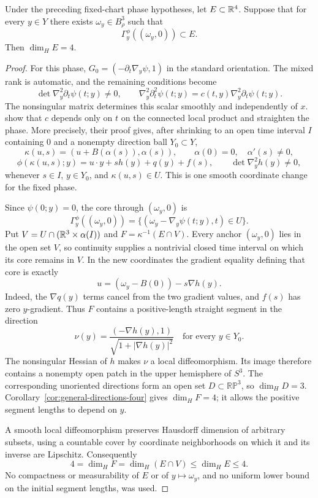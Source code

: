 \begin{corollary}
\label{cor:curved-kakeya-four}
Under the preceding fixed-chart phase hypotheses, let
\(E\subset\mathbb R^4\). Suppose that for every \(y\in Y\) there exists
\(\omega_y\in B_\rho^3\) such that
\[
 \Gamma_y^\phi((\omega_y,0))\subset E.
\]
Then \(\dim_H E=4\).
\end{corollary}
\begin{proof}
For this phase, \(G_0=(-\partial_t\nabla_y\psi,1)\) in the standard
orientation. The mixed rank is automatic, and the remaining
conditions become
\[
 \det\nabla_y^2\partial_t\psi(t;y)\ne0,\qquad
 \nabla_y^2\partial_t^2\psi(t;y)
   =c(t,y)\nabla_y^2\partial_t\psi(t;y).
\]
The nonsingular matrix determines this scalar smoothly and
independently of \(x\).
\citet[Corollary~4.2 and Theorem~1.12]{GaoLiuXi2025} show that \(c\)
depends only on \(t\) on the connected local product and straighten
the phase. More precisely, their proof gives, after shrinking to an
open time interval \(I\) containing \(0\) and a nonempty direction
ball \(Y_0\subset Y\),
\[
 \kappa(u,s)=(u+B(\alpha(s)),\alpha(s)),\qquad
 \alpha(0)=0,\quad \alpha'(s)\ne0,
\]
\[
 \phi(\kappa(u,s);y)=u\cdot y+s h(y)+q(y)+f(s),\qquad
 \det\nabla_y^2h(y)\ne0,
\]
whenever \(s\in I\), \(y\in Y_0\), and \(\kappa(u,s)\in U\).
This is one smooth coordinate change for the fixed phase.

Since \(\psi(0;y)=0\), the core through \((\omega_y,0)\) is
\[
 \Gamma_y^\phi((\omega_y,0))
 =\{(\omega_y-\nabla_y\psi(t;y),t)\in U\}.
\]
Put \(V=U\cap(\mathbb R^3\times\alpha(I))\) and
\(F=\kappa^{-1}(E\cap V)\). Every anchor \((\omega_y,0)\) lies in the
open set \(V\), so continuity supplies a nontrivial closed time
interval on which its core remains in \(V\). In the new coordinates
the gradient equality defining that core is exactly
\[
 u=(\omega_y-B(0))-s\nabla h(y).
\]
Indeed, the \(\nabla q(y)\) terms cancel from the two gradient values,
and \(f(s)\) has zero \(y\)-gradient. Thus \(F\) contains a
positive-length straight segment in the direction
\[
 \nu(y)=\frac{(-\nabla h(y),1)}
               {\sqrt{1+|\nabla h(y)|^2}}
 \quad\text{for every }y\in Y_0.
\]
The nonsingular Hessian of \(h\) makes \(\nu\) a local diffeomorphism.
Its image therefore contains a nonempty open patch in the upper
hemisphere of \(S^3\). The corresponding unoriented directions form
an open set \(D\subset\mathbb{RP}^3\), so \(\dim_H D=3\).
Corollary~\ref{cor:general-directions-four} gives \(\dim_H F=4\);
it allows the positive segment lengths to depend on \(y\).

A smooth local diffeomorphism preserves Hausdorff dimension of
arbitrary subsets, using a countable cover by coordinate
neighborhoods on which it and its inverse are Lipschitz. Consequently
\[
 4=\dim_H F=\dim_H(E\cap V)\le\dim_H E\le4.
\]
No compactness or measurability of \(E\) or of \(y\mapsto\omega_y\),
and no uniform lower bound on the initial segment lengths, was used.
\end{proof}

